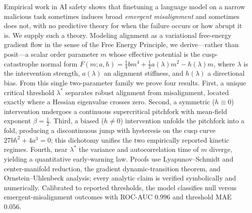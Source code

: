 Empirical work in AI safety shows that finetuning a language model on a narrow malicious
task sometimes induces broad \emph{emergent misalignment} and sometimes does not, with no
predictive theory for when the failure occurs or how abrupt it is. We supply such a theory.
Modeling alignment as a variational free-energy gradient flow in the sense of the Free Energy
Principle, we derive---rather than posit---a scalar order parameter $m$ whose effective
potential is the cusp-catastrophe normal form
$F(m;a,h)=\tfrac14 b m^4+\tfrac12 a(\lambda)m^2-h(\lambda)m$, where $\lambda$ is the
intervention strength, $a(\lambda)$ an alignment stiffness, and $h(\lambda)$ a directional
bias. From this single two-parameter family we prove four results. First, a unique critical
threshold $\lambda^\ast$ separates robust alignment from misalignment, located exactly where
a Hessian eigenvalue crosses zero. Second, a symmetric ($h\equiv0$) intervention undergoes a
continuous supercritical pitchfork with mean-field exponent $\beta=\tfrac12$. Third, a biased
($h\neq0$) intervention unfolds the pitchfork into a fold, producing a discontinuous jump with
hysteresis on the cusp curve $27bh^2+4a^3=0$; this dichotomy unifies the two empirically
reported kinetic regimes. Fourth, near $\lambda^\ast$ the variance and autocorrelation time of
$m$ diverge, yielding a quantitative early-warning law. Proofs use Lyapunov--Schmidt and
center-manifold reduction, the gradient dynamic-transition theorem, and Ornstein--Uhlenbeck
analysis; every analytic claim is verified symbolically and numerically. Calibrated to reported
thresholds, the model classifies null versus emergent-misalignment outcomes with ROC-AUC
$0.996$ and threshold MAE $0.056$.
